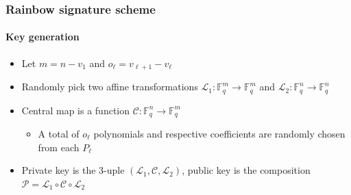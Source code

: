 \documentclass[12pt]{beamer}
\begin{document}
\begin{frame}
  \frametitle{Rainbow signature scheme}
  \framesubtitle{Key generation}
  \begin{itemize}
    \item Let $m = n - v_{1}$ and $o_{\ell} = v_{\ell + 1} - v_{\ell}$
    \item Randomly pick two affine transformations
        $\mathcal{L}_{1} : \mathbb{F}_{q}^{m} \to \mathbb{F}_{q}^{m}$ and
        $\mathcal{L}_{2} : \mathbb{F}_{q}^{n} \to \mathbb{F}_{q}^{n}$
    \item Central map is a function
        $\mathcal{C} : \mathbb{F}_{q}^{n} \to \mathbb{F}_{q}^{m}$
    \begin{itemize}
      \item A total of $o_{\ell}$ polynomials and respective coefficients are
          randomly chosen from each $P_{\ell}$
    \end{itemize}
    \item Private key is the $3$-uple
        $(\mathcal{L}_{1}, \mathcal{C}, \mathcal{L}_{2})$, public key is the
          composition $\mathcal{P} = \mathcal{L}_{1} \circ \mathcal{C} \circ
          \mathcal{L}_{2}$
  \end{itemize}
\end{frame}
\end{document}
